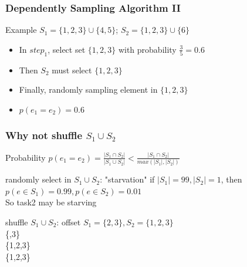 \documentclass[notheorems, aspectratio=54]{beamer}
\begin{document}
\begin{frame}
    \frametitle{Dependently Sampling Algorithm II}
    
    \begin{block}{Example}
        $S_1 =  \{1,2,3\} \cup \{4,5\}$; $S_2 = \{1,2,3\} \cup \{6\}$
        \begin{itemize}
            \item In $step_1$, select set $\{1,2,3\}$ with probability $\frac{3}{5} = 0.6$
            \item Then $S_2$ must select $\{1,2,3\}$
            \item Finally, randomly sampling element in $\{1,2,3\}$
            \item $p(e_1 = e_2) = 0.6$
        \end{itemize}
    \end{block}
\end{frame}

\begin{frame}
    \frametitle{Why not shuffle $S_1 \cup S_2$}
    \begin{block} {Probability}
        $p(e_1=e_2) = \frac{|S_1\cap S_2|}{|S_1 \cup S_2|} < \frac{|S_1\cap S_2|}{max(|S_1|,|S_2|)}$
    \end{block}
    \begin{block} {randomly select in $S_1\cup S_2$: "starvation"}
        if $|S_1| = 99, |S_2| = 1$,
        then $p(e \in S_1) = 0.99, p(e \in S_2) = 0.01$ \\
        So task2 may be starving
    \end{block}
    \begin{block} {shuffle $S_1\cup S_2$: offset}
        $S_1 = \{2,3\}, S_2 = \{1,2,3\}$\\
        \{\space {},3\}\\
        \{1,2,3\} \\
        \{1,2,3\}\\
    \end{block}
\end{frame}
\end{document}
